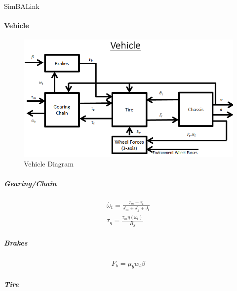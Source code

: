\documentclass[12pt,letterpaper]{report}
\author{Nathan}
\begin{document}
\begin{center}


SimBALink

\end{center}

\paragraph{Vehicle}
\begin{figure}[H]
  \centering
  \includegraphics[scale=.75]{Vehicle_Diagram}
  \caption{Vehicle Diagram}
\end{figure}

\subparagraph{Gearing/Chain}

\begin{gather}
\dot{\omega_t} = \frac{\tau_m - \tau_t}{J_m + J_g + J_t} \\
\tau_g = \frac{\tau_m \eta (\omega_t)}{R_g}
\end{gather}

\subparagraph{Brakes}

\begin{gather}
F_b = \mu_b w_t \beta
\end{gather}

\subparagraph{Tire}
\end{document}
